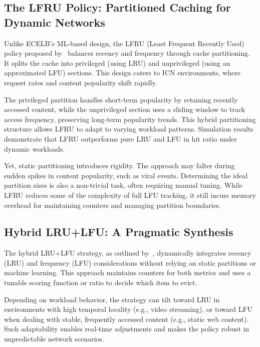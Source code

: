 \subsection{The LFRU Policy: Partitioned Caching for Dynamic Networks}

Unlike ECELB’s ML-based design, the LFRU (Least Frequent Recently Used) policy proposed by~\cite{Bilal2017CacheManagementSchemeforEfficientContentEvictionReplication} balances recency and frequency through cache partitioning. It splits the cache into privileged (using LRU) and unprivileged (using an approximated LFU) sections. This design caters to ICN environments, where request rates and content popularity shift rapidly.

The privileged partition handles short-term popularity by retaining recently accessed content, while the unprivileged section uses a sliding window to track access frequency, preserving long-term popularity trends. This hybrid partitioning structure allows LFRU to adapt to varying workload patterns. Simulation results demonstrate that LFRU outperforms pure LRU and LFU in hit ratio under dynamic workloads.

Yet, static partitioning introduces rigidity. The approach may falter during sudden spikes in content popularity, such as viral events. Determining the ideal partition sizes is also a non-trivial task, often requiring manual tuning. While LFRU reduces some of the complexity of full LFU tracking, it still incurs memory overhead for maintaining counters and managing partition boundaries.

\subsection{Hybrid LRU+LFU: A Pragmatic Synthesis}

The hybrid LRU+LFU strategy, as outlined by~\cite{shah2023ImprovedCacheEviction}, dynamically integrates recency (LRU) and frequency (LFU) considerations without relying on static partitions or machine learning. This approach maintains counters for both metrics and uses a tunable scoring function or ratio to decide which item to evict.

Depending on workload behavior, the strategy can tilt toward LRU in environments with high temporal locality (e.g., video streaming), or toward LFU when dealing with stable, frequently accessed content (e.g., static web content). Such adaptability enables real-time adjustments and makes the policy robust in unpredictable network scenarios.

